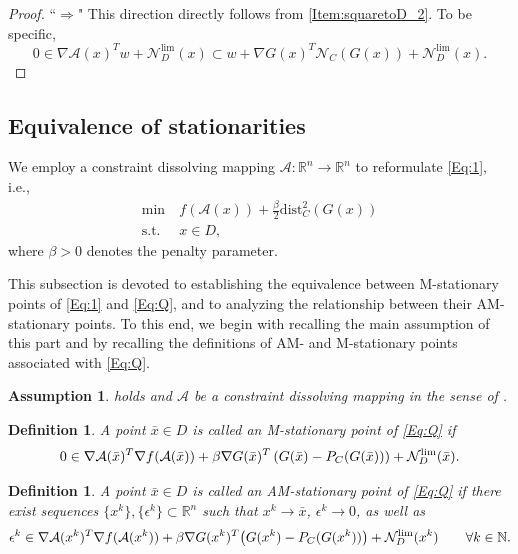 \documentclass[11pt,a4paper,reqno]{amsart}
\newtheorem{definition}[theorem]{Definition}
\newtheorem{assumption}{Assumption}
\begin{document}
{\begin{proof}
    ``$\Longrightarrow$" This direction directly follows from \eqref{Item:squaretoD_2}. To be specific, 
    \begin{equation*}
            0\in \nabla \mathcal A(x)^Tw+\mathcal N_D^{\text{lim}}(x)
            \subset w+ \nabla G(x)^T\mathcal N_C(G(x)) + \mathcal N_D^{\text{lim}}(x).
    \end{equation*}
\end{proof}

\subsection{Equivalence of stationarities}

We employ a constraint dissolving mapping $\mathcal A:\mathbb R^n \to \mathbb R^n$ to reformulate \eqref{Eq:1}, i.e.,
\begin{equation}\label{Eq:Q}\tag{Q}
\begin{aligned}
  \min \ &f(\mathcal A(x)) + \frac{\beta}{2}\text{dist}^2_C(G(x)) \\ 
  \text{s.t.} \ & x\in D,
\end{aligned}
\end{equation}
where $\beta>0$ denotes the penalty parameter.

This subsection is devoted to establishing the equivalence between M-stationary points of \eqref{Eq:1} and \eqref{Eq:Q}, and to analyzing the relationship between their AM-stationary points. To this end, we begin with recalling the main assumption of this part and by recalling the definitions of AM- and M-stationary points associated with \eqref{Eq:Q}.

\begin{assumption}\label{ass:stationarity}
     holds and $\mathcal A$ be a constraint dissolving mapping in the sense of .
\end{assumption}

\begin{definition}\label{Def:MQ}
    A point $ \bar x \in D $ is called an \emph{M-stationary point}
of \eqref{Eq:Q} if
\begin{equation*}
    0 \in \nabla \mathcal A(\bar x)^T \nabla f(\mathcal A(\bar x)) + \beta \nabla G(\bar x)^T\left(G(\bar x)-P_C(G(\bar x))\right)+\mathcal{N}_D^\textup{lim} (\bar x).
\end{equation*}
\end{definition}

\begin{definition}\label{Def:AMforQ}
A point $ \bar x \in D $ is called an \emph{AM-stationary point}
of \eqref{Eq:Q} if there exist sequences 
$\{ x^k \},\{\epsilon^k\}\subset\mathbb R^n$ such that
$x^k\to\bar x$, $\epsilon^k\to 0$, as well as
\begin{equation*}
   \epsilon^k \in \nabla \mathcal A(x^k)^T \nabla f(\mathcal A(x^k)) +  \beta \nabla G(x^k)^T \big(G(x^k)-P_C(G(x^k))\big)+\mathcal N_D^\textup{lim} (x^k)
   \qquad
   \forall k\in\mathbb N.
\end{equation*}
\end{definition}

}
\end{document}
